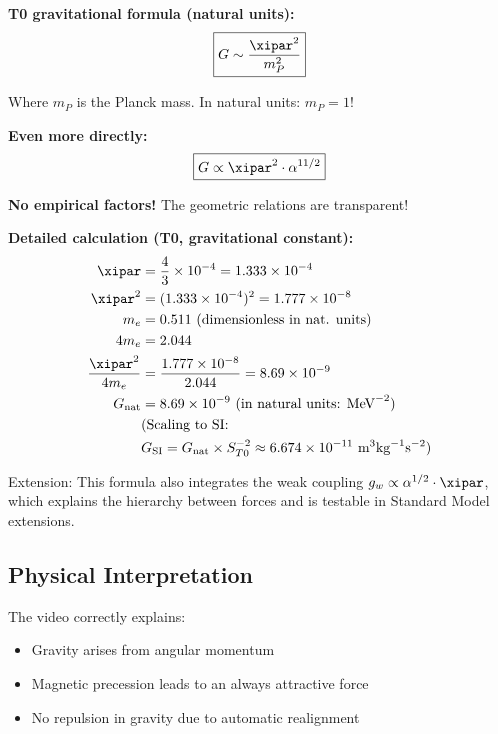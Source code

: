 	\begin{vorteil}
		\textbf{T0 gravitational formula (natural units):}
		\begin{equation}
			\boxed{G \sim \frac{\xipar^2}{m_P^2}}
		\end{equation}
		
		Where $m_P$ is the Planck mass. In natural units: $m_P = 1$!
		
		\textbf{Even more directly:}
		\begin{equation}
			\boxed{G \propto \xipar^2 \cdot \alpha^{11/2}}
		\end{equation}
		
		\textbf{No empirical factors!} The geometric relations are transparent!
		
		\textbf{Detailed calculation (T0, gravitational constant):}
		\begin{align}
			\xipar &= \frac{4}{3} \times 10^{-4} = 1.333 \times 10^{-4} \\
			\xipar^2 &= (1.333 \times 10^{-4})^2 = 1.777 \times 10^{-8} \\
			m_e &= 0.511 \text{ (dimensionless in nat. units)} \\
			4 m_e &= 2.044 \\
			\frac{\xipar^2}{4 m_e} &= \frac{1.777 \times 10^{-8}}{2.044} = 8.69 \times 10^{-9} \\
			G_{\text{nat}} &= 8.69 \times 10^{-9} \text{ (in natural units: MeV}^{-2}\text{)} \\
			&\text{(Scaling to SI: } \\ 
			&G_{\text{SI}} = G_{\text{nat}} \times S_{T0}^{-2} \approx 6.674 \times 10^{-11} \text{ m}^3 \text{kg}^{-1} \text{s}^{-2}\text{)}
		\end{align}
		
		Extension: This formula also integrates the weak coupling $g_w \propto \alpha^{1/2} \cdot \xipar$, which explains the hierarchy between forces and is testable in Standard Model extensions.
	\end{vorteil}
	
	\subsection{Physical Interpretation}
	
	The video correctly explains:
	\begin{itemize}
		\item Gravity arises from angular momentum
		\item Magnetic precession leads to an always attractive force
		\item No repulsion in gravity due to automatic realignment
	\end{itemize}
	
